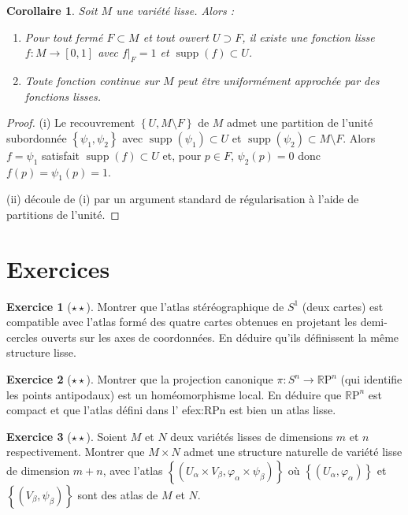 \documentclass[12pt,a4paper,openany]{book}
\theoremstyle{definition}
\newtheorem{exercice}{Exercice}[chapter]
\theoremstyle{plain}
\newtheorem{corollaire}[definition]{Corollaire}
\theoremstyle{remark}
\newcommand{\RP}{\mathbb{R}\mathrm{P}}
\newcommand{\set}[1]{\left\{#1\right\}}
\begin{document}
\begin{corollaire}\label{cor:partition-applications}
Soit $M$ une variété lisse. Alors :
\begin{enumerate}[label=(\roman*)]
    \item Pour tout fermé $F \subset M$ et tout ouvert $U \supset F$, il
    existe une fonction lisse $f \colon M \to [0,1]$ avec $f|_F = 1$ et
    $\operatorname{supp}(f) \subset U$.
    \item Toute fonction continue sur $M$ peut être uniformément approchée par
    des fonctions lisses.
\end{enumerate}
\end{corollaire}

\begin{proof}
(i) Le recouvrement $\set{U, M \setminus F}$ de $M$ admet une partition de
l'unité subordonnée $\set{\psi_1, \psi_2}$ avec $\operatorname{supp}(\psi_1)
\subset U$ et $\operatorname{supp}(\psi_2) \subset M \setminus F$. Alors
$f = \psi_1$ satisfait $\operatorname{supp}(f) \subset U$ et, pour $p \in F$,
$\psi_2(p) = 0$ donc $f(p) = \psi_1(p) = 1$.

(ii) découle de (i) par un argument standard de régularisation à l'aide de
partitions de l'unité.
\end{proof}


\section{Exercices}
\label{sec:exercices-ch1}

\begin{exercice}[$\star\star$]\label{exo:atlas-S1}
Montrer que l'atlas stéréographique de $S^1$ (deux cartes) est compatible avec
l'atlas formé des quatre cartes obtenues en projetant les demi-cercles ouverts
sur les axes de coordonnées. En déduire qu'ils définissent la même structure
lisse.
\end{exercice}

\begin{exercice}[$\star\star$]\label{exo:RPn-quotient}
Montrer que la projection canonique $\pi \colon S^n \to \RP^n$ (qui identifie
les points antipodaux) est un homéomorphisme local. En déduire que $\RP^n$ est
compact et que l'atlas défini dans l'
ef{ex:RPn} est bien un atlas lisse.
\end{exercice}

\begin{exercice}[$\star\star$]\label{exo:produit-varietes}
Soient $M$ et $N$ deux variétés lisses de dimensions $m$ et $n$ respectivement.
Montrer que $M \times N$ admet une structure naturelle de variété lisse de
dimension $m + n$, avec l'atlas $\set{(U_\alpha \times V_\beta, \varphi_\alpha
\times \psi_\beta)}$ où $\set{(U_\alpha, \varphi_\alpha)}$ et $\set{(V_\beta,
\psi_\beta)}$ sont des atlas de $M$ et $N$.
\end{exercice}
\end{document}
